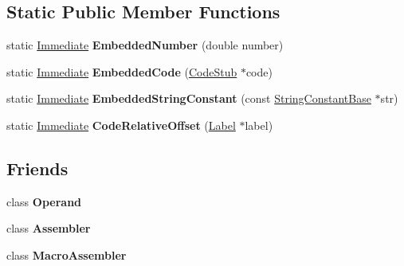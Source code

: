 \subsection*{Static Public Member Functions}
\begin{DoxyCompactItemize}
\item 
\mbox{\label{classv8_1_1internal_1_1Immediate_a662388100ab244d72b874277dc16315e}} 
static \mbox{\hyperlink{classv8_1_1internal_1_1Immediate}{Immediate}} {\bfseries Embedded\+Number} (double number)
\item 
\mbox{\label{classv8_1_1internal_1_1Immediate_affd145f9f252bc90cc12eca39142535f}} 
static \mbox{\hyperlink{classv8_1_1internal_1_1Immediate}{Immediate}} {\bfseries Embedded\+Code} (\mbox{\hyperlink{classv8_1_1internal_1_1CodeStub}{Code\+Stub}} $\ast$code)
\item 
\mbox{\label{classv8_1_1internal_1_1Immediate_aba01b5a65661054f932d94604d6a1708}} 
static \mbox{\hyperlink{classv8_1_1internal_1_1Immediate}{Immediate}} {\bfseries Embedded\+String\+Constant} (const \mbox{\hyperlink{classv8_1_1internal_1_1StringConstantBase}{String\+Constant\+Base}} $\ast$str)
\item 
\mbox{\label{classv8_1_1internal_1_1Immediate_aee0c9dd5cd8201980e7a4d9f7e326a3e}} 
static \mbox{\hyperlink{classv8_1_1internal_1_1Immediate}{Immediate}} {\bfseries Code\+Relative\+Offset} (\mbox{\hyperlink{classv8_1_1internal_1_1Label}{Label}} $\ast$label)
\end{DoxyCompactItemize}
\subsection*{Friends}
\begin{DoxyCompactItemize}
\item 
\mbox{\label{classv8_1_1internal_1_1Immediate_a7b8d0ee5e2ffdb09cfa7faade3d8c711}} 
class {\bfseries Operand}
\item 
\mbox{\label{classv8_1_1internal_1_1Immediate_ab679df99d1569d09fdf3358620a4ad34}} 
class {\bfseries Assembler}
\item 
\mbox{\label{classv8_1_1internal_1_1Immediate_ae605ff1d9d93250ace8a0a8b8d1dee67}} 
class {\bfseries Macro\+Assembler}
\end{DoxyCompactItemize}


